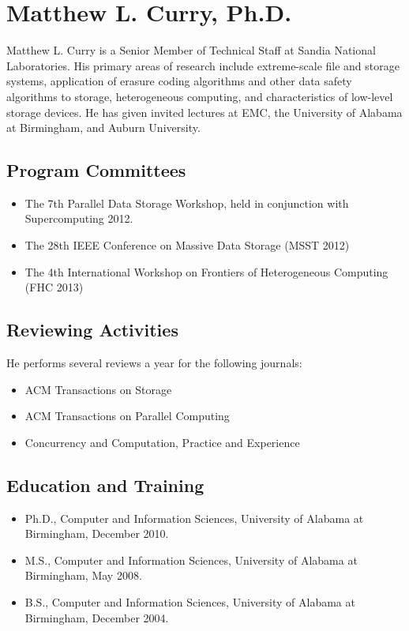 \documentclass[11pt]{article}
\begin{document}
\section{Matthew L. Curry, Ph.D.}

Matthew L. Curry is a Senior Member of Technical Staff at Sandia
National Laboratories. His primary areas of research include
extreme-scale file and storage systems, application of erasure coding
algorithms and other data safety algorithms to storage, heterogeneous
computing, and characteristics of low-level storage devices. He has
given invited lectures at EMC, the University of Alabama at
Birmingham, and Auburn University.

\subsection{Program Committees}
\begin{itemize}
\item The 7th Parallel Data Storage Workshop, held in conjunction with
  Supercomputing 2012.
\item The 28th IEEE Conference on Massive Data Storage (MSST 2012)
\item The 4th International Workshop on Frontiers of Heterogeneous
  Computing (FHC 2013)
\end{itemize}

\subsection{Reviewing Activities}
He performs several reviews a year for the following journals:
\begin{itemize}
\item ACM Transactions on Storage
\item ACM Transactions on Parallel Computing
\item Concurrency and Computation, Practice and Experience
\end{itemize}

\subsection{Education and Training}
\begin{itemize}
\item Ph.D., Computer and Information Sciences, University of Alabama at Birmingham, December 2010.
\item M.S., Computer and Information Sciences, University of Alabama at Birmingham, May 2008.
\item B.S., Computer and Information Sciences, University of Alabama at Birmingham, December 2004.
\end{itemize}
\end{document}

